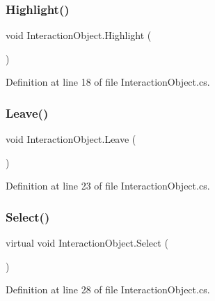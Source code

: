 \subsubsection{\texorpdfstring{Highlight()}{Highlight()}}
{\footnotesize\ttfamily void Interaction\+Object.\+Highlight (\begin{DoxyParamCaption}{ }\end{DoxyParamCaption})}



Definition at line 18 of file Interaction\+Object.\+cs.

\mbox{\label{class_interaction_object_aea9d2f164a5fb7a5494e441b61c37eca}} 
\subsubsection{\texorpdfstring{Leave()}{Leave()}}
{\footnotesize\ttfamily void Interaction\+Object.\+Leave (\begin{DoxyParamCaption}{ }\end{DoxyParamCaption})}



Definition at line 23 of file Interaction\+Object.\+cs.

\mbox{\label{class_interaction_object_a7db5da832121349c0d9133edb8d15f1a}} 
\subsubsection{\texorpdfstring{Select()}{Select()}}
{\footnotesize\ttfamily virtual void Interaction\+Object.\+Select (\begin{DoxyParamCaption}{ }\end{DoxyParamCaption})\hspace{0.3cm}{\ttfamily [virtual]}}



Definition at line 28 of file Interaction\+Object.\+cs.

\mbox{\label{class_interaction_object_a0ad947302ed8ed51e72b0bd400e13ecf}} 
